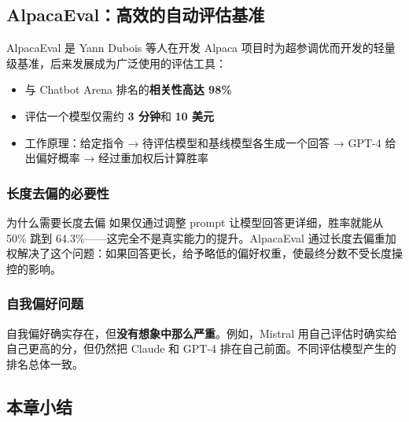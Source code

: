\documentclass[a4paper]{article}
\begin{document}
\subsection{AlpacaEval：高效的自动评估基准}





AlpacaEval 是 Yann Dubois 等人在开发 Alpaca 项目时为超参调优而开发的轻量级基准，后来发展成为广泛使用的评估工具：

\begin{itemize}
    \item 与 Chatbot Arena 排名的\textbf{相关性高达 98\%}
    \item 评估一个模型仅需约 \textbf{3 分钟}和 \textbf{10 美元}
    \item 工作原理：给定指令 → 待评估模型和基线模型各生成一个回答 → GPT-4 给出偏好概率 → 经过重加权后计算胜率
\end{itemize}





\subsubsection{长度去偏的必要性}





\begin{importantbox}{为什么需要长度去偏}
如果仅通过调整 prompt 让模型回答更详细，胜率就能从 50\% 跳到 64.3\%——这完全不是真实能力的提升。AlpacaEval 通过长度去偏重加权解决了这个问题：如果回答更长，给予略低的偏好权重，使最终分数不受长度操控的影响。
\end{importantbox}

\subsubsection{自我偏好问题}





自我偏好确实存在，但\textbf{没有想象中那么严重}。例如，Mistral 用自己评估时确实给自己更高的分，但仍然把 Claude 和 GPT-4 排在自己前面。不同评估模型产生的排名总体一致。

\subsection{本章小结}
\end{document}
